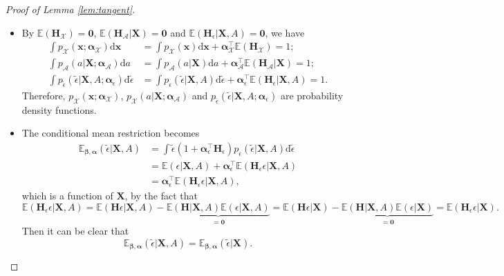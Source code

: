 \documentclass[11pt]{article}
\numberwithin{equation}{section}
\theoremstyle{definition}
\theoremstyle{remark}
\newcommand{\bx}{\bm{x}}
\newcommand{\bH}{\bm{H}}
\newcommand{\bX}{\bm{X}}
\newcommand{\bbeta}{\bm{\beta}}
\newcommand{\balpha}{\bm{\alpha}}
\newcommand{\bbE}{\mathbb{E}}
\newcommand{\sA}{\mathscr{A}}
\newcommand{\sX}{\mathscr{X}}
\newcommand{\bzero}{\mathbf{0}}	%
\newcommand{\rd}{\mathrm{d}}
\begin{document}
\begin{proof}[Proof of Lemma \ref{lem:tangent}]
\begin{itemize}
		\item By $ \bbE(\bH_{\sX}) = \bzero $, $ \bbE(\bH_{\sA}|\bX) = \bzero $ and $ \bbE(\bH_{\epsilon}|\bX,A) = \bzero $, we have
		\begin{align*}
			\int p_{\sX}(\bx;\balpha_{\sX})\rd \bx &= \int p_{\sX}(\bx)\rd \bx + \balpha^{\intercal}_{\sX}\bbE(\bH_{\sX}) = 1;\\
			\int p_{\sA}(a|\bX;\balpha_{\sA})\rd a &= \int p_{\sA}(a|\bX)\rd a + \balpha_{\sA}^{\intercal}\bbE(\bH_{\sA}|\bX) = 1; \\
			\int p_{\widetilde{\epsilon}}(\widetilde{\epsilon}|\bX,A;\balpha_{\epsilon}) \rd \widetilde{\epsilon} &= \int p_{\epsilon}(\widetilde{\epsilon}|\bX,A) \rd \widetilde{\epsilon} + \balpha_{\epsilon}^{\intercal}\bbE(\bH_{\epsilon}|\bX,A) = 1.
		\end{align*}
		Therefore, $ p_{\sX}(\bx;\balpha_{\sX}) $, $ p_{\sX}(a|\bX;\balpha_{\sA}) $ and $ p_{\widetilde{\epsilon}}(\widetilde{\epsilon}|\bX,A;\balpha_{\epsilon}) $ are probability density functions.
		
		\item The conditional mean restriction becomes
		\begin{align*}
			\bbE_{\bbeta,\balpha}(\widetilde{\epsilon}|\bX,A) &= \int \widetilde{\epsilon}(1 + \balpha_{\epsilon}^{\intercal}\bH_{\epsilon})p_{\epsilon}(\widetilde{\epsilon}|\bX,A)\rd \widetilde{\epsilon} \\
			&= \bbE(\epsilon|\bX,A) + \balpha_{\epsilon}^{\intercal}\bbE(\bH_{\epsilon }\epsilon|\bX,A)\\
			&= \balpha_{\epsilon}^{\intercal}\bbE(\bH_{\epsilon }\epsilon|\bX,A),
		\end{align*}
		which is a function of $ \bX $, by the fact that
		\[ \bbE(\bH_{\epsilon}\epsilon|\bX,A) = \bbE(\bH\epsilon|\bX,A) - \underbrace{\bbE(\bH|\bX,A)\bbE(\epsilon|\bX,A)}_{= \bzero} = \bbE(\bH\epsilon|\bX) - \underbrace{\bbE(\bH|\bX,A)\bbE(\epsilon|\bX)}_{= \bzero} = \bbE(\bH_{\epsilon}\epsilon|\bX). \]
		Then it can be clear that
		\[ \bbE_{\bbeta,\balpha}(\widetilde{\epsilon}|\bX,A) = \bbE_{\bbeta,\balpha}(\widetilde{\epsilon}|\bX). \]
		

\end{itemize}
\end{proof}
\end{document}
